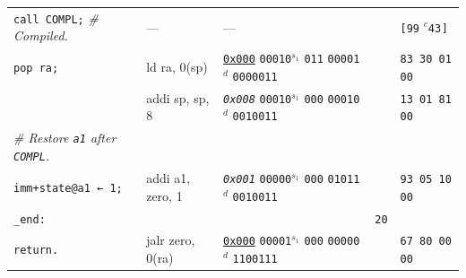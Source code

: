 \documentclass[a4paper,12pt,final]{article}
\begin{document}
\begin{table}[!htbp]
\begin{adjustwidth}{-1cm}{-1cm}
\begin{center}
\begin{tabular}{l|ll|l|l}
\hspace{1.053000em} \texttt{call COMPL;}  \emph{\# Compiled.} & --- & --- &  & \texttt{[99} \(^{c}\)​\texttt{43}​\(_{}\)​\texttt{]}\\[0pt]
\hspace{1.053000em} \texttt{pop ra;} & ld ra, 0(sp) & \uline{\texttt{0x000}}                    \texttt{00010}​\(^{s_{1}}\) \texttt{011} \texttt{00001}​\(^{d}\)  \texttt{0000011} &  & \texttt{83 30 01 00}\\[0pt]
\hspace{1.053000em} & addi sp, sp, 8 & \emph{\texttt{0x008}}                    \texttt{00010}​\(^{s_{1}}\) \texttt{000} \texttt{00010}​\(^{d}\)  \texttt{0010011} &  & \texttt{13 01 81 00}\\[0pt]
\hspace{1.053000em} \emph{\# Restore \texttt{a1} after \texttt{COMPL}.} &  &  &  & \\[0pt]
\hspace{1.053000em} \texttt{imm+state@a1 ← 1;} & addi a1, zero, 1 & \emph{\texttt{0x001}}                    \texttt{00000}​\(^{s_{1}}\) \texttt{000} \texttt{01011}​\(^{d}\)  \texttt{0010011} &  & \texttt{93 05 10 00}\\[0pt]
\texttt{\_end:} &  &  & \texttt{20} & \\[0pt]
\hspace{1.053000em} \texttt{return.} & jalr zero, 0(ra) & \uline{\texttt{0x000}}                    \texttt{00001}​\(^{s_{1}}\) \texttt{000} \texttt{00000}​\(^{d}\)  \texttt{1100111} &  & \texttt{67 80 00 00}\\[0pt]
\end{tabular}

\end{center}
\normalsize \end{adjustwidth} \end{table} \vspace{0}
\end{document}
